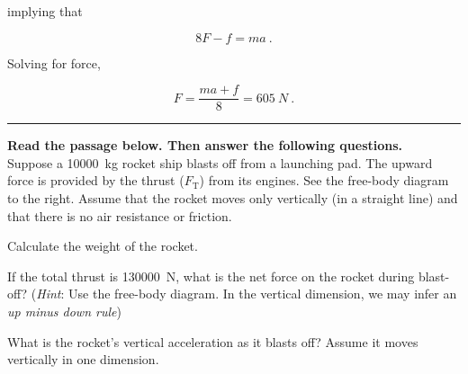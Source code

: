 \documentclass{exam}
\begin{document}
\begin{questions}
\begin{solution}
implying that

\begin{equation*}
     8F - f = ma\ .
\end{equation*}

Solving for force,

\begin{equation*}
    F = \frac{ma + f}{8} = \SI{605}{N}\ .
\end{equation*}
\end{solution}
\vspace{1em}

\hrule

\begin{EnvUplevel}
\hspace{2cm}
\begin{minipage}{0.6\textwidth}
\textbf{Read the passage below. Then answer the following questions.}\\

Suppose a \SI{10000}{kg} rocket ship blasts off from a launching pad. The upward force is provided by the thrust ($F_{\text{T}}$) from its engines. See the free-body diagram to the right. Assume that the rocket moves only vertically (in a straight line) and that there is no air resistance or friction.
\end{minipage}%
\hspace{-2cm}
\begin{minipage}{0.5\textwidth}
\centering
\end{minipage}

\end{EnvUplevel}

\question
Calculate the weight of the rocket.

\question
If the total thrust is \SI{130000}{N}, what is the net force on the rocket during blast-off?
(\textit{Hint}: Use the free-body diagram. In the vertical dimension, we may infer an \textit{up minus down rule})

\question
What is the rocket's vertical acceleration as it blasts off? Assume it moves vertically in one dimension.

\begin{solution}
\vspace{1em}


\end{solution}
\end{questions}
\end{document}
